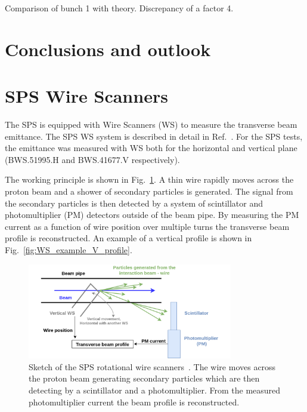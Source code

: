 Comparison of bunch 1 with theory. Discrepancy of a factor 4.

\section{Conclusions and outlook}\label{sec:MD2018_summary}





\section{SPS Wire Scanners}\label{sec:sps_ws}
The SPS is equipped with Wire Scanners (WS) to measure the transverse beam emittance. The SPS WS system is described in detail in Ref.~\cite{BOSSER1985475, Berrig:1972478}. For the SPS tests, the emittance was measured with WS both for the horizontal and vertical plane (BWS.51995.H and BWS.41677.V respectively).

The working principle is shown in Fig.~\ref{fig:SPS_WS_ROT}. A thin wire rapidly moves across the proton beam and a shower of secondary particles is generated. The signal from the secondary particles is then detected by a system of scintillator and photomultiplier (PM) detectors outside of the beam pipe. By measuring the PM current as a function of wire position over multiple turns the transverse beam profile is reconstructed. An example of a vertical profile is shown in Fig.~\ref{fig:WS_example_V_profile}.

\begin{figure}[!h]
   \centering         
   \includegraphics[width=0.8\textwidth]{images/Ch4/Wire_scanner.png}
       \caption{Sketch of the SPS rotational wire scanners~\cite{Berrig:1972478}. The wire moves across the proton beam generating secondary particles which are then detecting by a scintillator and a photomultiplier. From the measured photomultiplier current the beam profile is reconstructed.}
       \label{fig:SPS_WS_ROT}
\end{figure}


